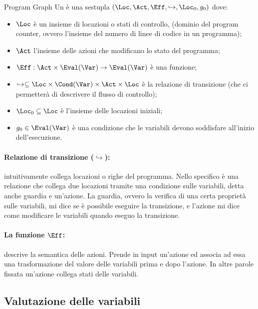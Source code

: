 \begin{definition}{Program Graph}
  Un  è una sestupla \((\Loc,\Act,\Eff,\hookrightarrow , \Loc_0, g_0)\) dove:
  \begin{itemize}
    \item \(\Loc\) è un insieme di locazioni o stati di controllo, (dominio del program counter, ovvero l'insieme del numero di linee di codice in un programma);
    \item \(\Act\) l'insieme delle azioni che modificano lo stato del programma;
    \item \(\Eff : \Act\times \Eval(\Var) \to \Eval(\Var)\) è una funzione;
    \item \(\hookrightarrow \subseteq \Loc \times \Cond(\Var) \times \Act \times \Loc\) è la relazione di transizione (che ci permetterà di descrivere il flusso di controllo);
    \item \(\Loc_0 \subseteq \Loc\) è l'insieme delle locazioni iniziali;
    \item \(g_0 \in \Eval(\Var)\) è una condizione che le variabili devono soddisfare all'inizio dell'esecuzione.
  \end{itemize}
\end{definition}

\paragraph{Relazione di transizione (\(\hookrightarrow\)):} intuitivamente collega  locazioni o righe del programma. Nello specifico è una relazione che collega due locazioni tramite una condizione sulle variabili, detta anche guardia e un'azione.
La guardia, ovvero la verifica di una certa proprietà sulle variabili, mi dice se è possibile eseguire la transizione, e l'azione mi dice come modificare le variabili quando eseguo la transizione.

\paragraph{La funzione \(\Eff\):} descrive la semantica delle azioni. Prende in input un'azione ed associa ad essa una trasformazione del valore delle variabili prima e dopo l'azione. In altre parole fissata un'azione collega  stati delle variabili.


\subsection{Valutazione delle variabili}

